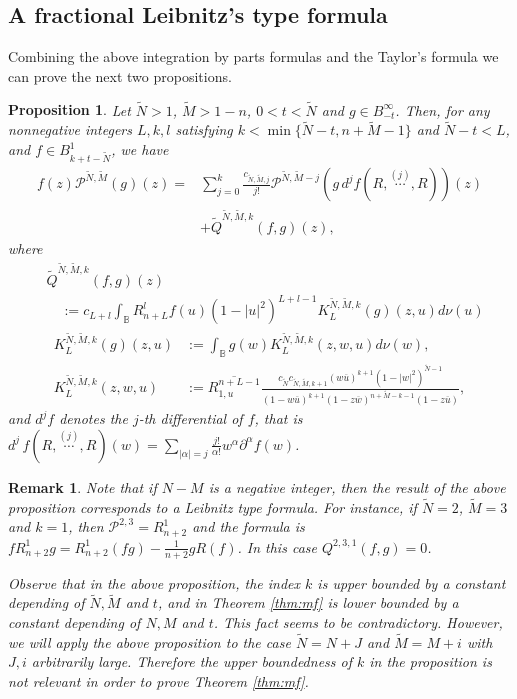\documentclass[12pt,twoside,leqno,final]{amsart}
\theoremstyle{plain}
\newtheorem{prop}[thm]{Proposition}
\newtheorem{rem}[thm]{Remark}
\begin{document}
\subsection{A fractional Leibnitz's type formula}
Combining the above integration by parts formulas and the Taylor's formula  we can prove 
the next two propositions. 

\begin{prop}\label{prop:formula}
Let $\tilde N>1$, $\tilde M>1-n$, $0<t<\tilde N$ and $g\in B^\infty_{-t}$. Then, for any nonnegative integers
$L,k,l$ satisfying $k<\min\{\tilde N-t,n+\tilde M-1\}$ and  $\tilde N-t<L$,  and $f\in B^1_{k+t-\tilde N}$, we have 
\begin{align*}
f(z) {{\mathcal P}}^{\tilde N,\tilde M} (g)(z)=&\sum_{j=0}^k \frac{c_{\tilde N,\tilde M,j}}{j!} {{\mathcal P}}^{\tilde N,\tilde M-j}\left(g\,d^j f(R,\overset{(j)}{\cdots},R)\right)(z)\\
&+\tilde Q^{\tilde N,\tilde M,k}(f,g)(z),
\end{align*}
where
\begin{align*}
&\tilde Q^{\tilde N,\tilde M,k}(f,g)(z)\\
&\quad:=c_{L+l}\int_{{\mathbb B}} R^l_{n+L} f(u)(1-|u|^2)^{L+l-1}K^{\tilde N,\tilde M,k}_L(g)(z,u) d\nu(u)
\end{align*}
\begin{align*}
K^{\tilde N,\tilde M,k}_L(g)(z,u)&:=\int_{{\mathbb B}} g(w) K^{\tilde N,\tilde M,k}_L(z,w,u)d\nu(w),\\
K^{\tilde N,\tilde M,k}_L(z,w,u)&:=\overline{R^{n+L-1}_{1,u}}
\frac{c_{\tilde N}c_{\tilde N,\tilde M,k+1}(w\overline u)^{k+1}(1-|w|^2)^{\tilde N-1}}
{(1-w\overline u)^{k+1}(1-z\overline w)^{n+\tilde M-k-1}(1-z\overline u)},
\end{align*}
and $d^j f$ denotes the $j$-th differential of $f$, that is 
$d^j\,f(R,\overset{(j)}{\cdots},R)(w)=\sum_{|\alpha|=j}\frac{j!}{\alpha!}w^\alpha{\partial}^\alpha f(w) $.
\end{prop}

\begin{rem}\label{rem:remmf3}
Note that if $N-M$ is a negative integer, 
then the result of the above proposition corresponds to a  Leibnitz type formula.
 For instance, if $\tilde N=2$, $\tilde M=3$ and $k=1$, then ${{\mathcal P}}^{2,3}=R^1_{n+2}$ and 
the formula is 
$f R^1_{n+2} g=R^1_{n+2} (fg)-\frac{1}{n+2}gR (f)$. In this case $Q^{2,3,1}(f,g)=0$.

Observe that in the above proposition, 
the index $k$ is upper bounded by a constant depending of $\tilde N, \tilde M$ and $t$, 
and in Theorem \ref{thm:mf} is lower bounded by a constant depending of $N, M$ and $t$. 
This fact seems to be contradictory. However,  
we will apply the above proposition to the case $\tilde N=N+J$ and $\tilde M=M+i$ 
with $J, i$ arbitrarily large.
Therefore the upper boundedness of $k$ in the proposition is not relevant in order to prove   
 Theorem \ref{thm:mf}.
\end{rem} 
\end{document}
